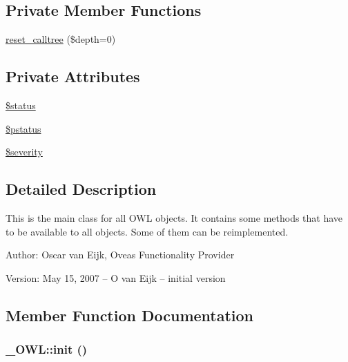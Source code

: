 \subsection*{Private Member Functions}
\begin{CompactItemize}
\item 
\hyperlink{class__OWL_91389e63fc76f6513147f302cbd92a2e}{reset\_\-calltree} (\$depth=0)
\end{CompactItemize}
\subsection*{Private Attributes}
\begin{CompactItemize}
\item 
\hyperlink{class__OWL_af448f6bc8a90e20c09e9e2b8fe46eb5}{\$status}
\item 
\hyperlink{class__OWL_f30c6ce2c59df6da2ef0f7059be9231e}{\$pstatus}
\item 
\hyperlink{class__OWL_d26b40a9dbbacb33e299b17826f8327c}{\$severity}
\end{CompactItemize}


\subsection{Detailed Description}
This is the main class for all OWL objects. It contains some methods that have to be available to all objects. Some of them can be reimplemented. \begin{Desc}
\item[Author:]Oscar van Eijk, Oveas Functionality Provider \end{Desc}
\begin{Desc}
\item[Version:]May 15, 2007 -- O van Eijk -- initial version \end{Desc}


\subsection{Member Function Documentation}
\hypertarget{class__OWL_e0ef3ded56e8a6b34b6461e5a721cd3e}{
\subsubsection{\setlength{\rightskip}{0pt plus 5cm}\_\-OWL::init ()}}
\label{class__OWL_e0ef3ded56e8a6b34b6461e5a721cd3e}



